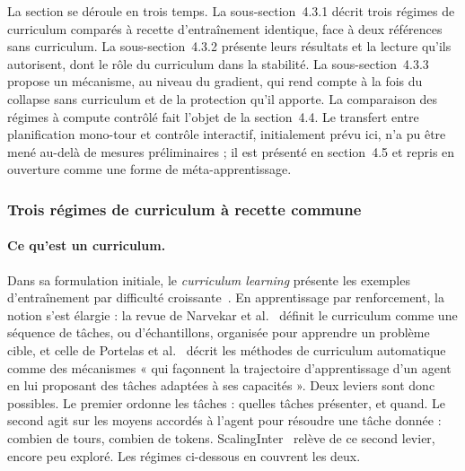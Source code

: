 \documentclass[11pt,a4paper]{article}
\begin{document}
La section se déroule en trois temps. La sous-section~4.3.1 décrit trois régimes de curriculum comparés à recette d'entraînement identique, face à deux références sans curriculum. La sous-section~4.3.2 présente leurs résultats et la lecture qu'ils autorisent, dont le rôle du curriculum dans la stabilité. La sous-section~4.3.3 propose un mécanisme, au niveau du gradient, qui rend compte à la fois du collapse sans curriculum et de la protection qu'il apporte. La comparaison des régimes à compute contrôlé fait l'objet de la section~4.4. Le transfert entre planification mono-tour et contrôle interactif, initialement prévu ici, n'a pu être mené au-delà de mesures préliminaires ; il est présenté en section~4.5 et repris en ouverture comme une forme de méta-apprentissage.





\subsubsection{Trois régimes de curriculum à recette commune}

\paragraph{Ce qu'est un curriculum.} Dans sa formulation initiale, le \emph{curriculum learning} présente les exemples d'entraînement par difficulté croissante~\cite{bengio2009curriculum}. En apprentissage par renforcement, la notion s'est élargie : la revue de Narvekar et al.~\cite{narvekar2020curriculum} définit le curriculum comme une séquence de tâches, ou d'échantillons, organisée pour apprendre un problème cible, et celle de Portelas et al.~\cite{portelas2020acl} décrit les méthodes de curriculum automatique comme des mécanismes « qui façonnent la trajectoire d'apprentissage d'un agent en lui proposant des tâches adaptées à ses capacités ». Deux leviers sont donc possibles. Le premier ordonne les tâches : quelles tâches présenter, et quand. Le second agit sur les moyens accordés à l'agent pour résoudre une tâche donnée : combien de tours, combien de tokens. ScalingInter~\cite{xi_agentgym-rl_2025} relève de ce second levier, encore peu exploré. Les régimes ci-dessous en couvrent les deux.
\end{document}
